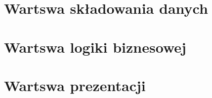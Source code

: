 

\section{Wartswa składowania danych}





\section{Wartswa logiki biznesowej}





\section{Wartswa prezentacji}
